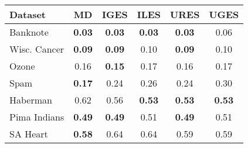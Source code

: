 \begin{tabular}{lccccc}
\toprule
Dataset & MD & IGES & ILES & URES & UGES \\
\midrule
Banknote & \textbf{0.03} & \textbf{0.03} & \textbf{0.03} & \textbf{0.03} & 0.06 \\
Wisc. Cancer & \textbf{0.09} & \textbf{0.09} & 0.10 & \textbf{0.09} & 0.10 \\
Ozone & 0.16 & \textbf{0.15} & 0.17 & 0.16 & 0.17 \\
Spam & \textbf{0.17} & 0.24 & 0.26 & 0.24 & 0.30 \\
Haberman & 0.62 & 0.56 & \textbf{0.53} & \textbf{0.53} & \textbf{0.53} \\
Pima Indians & \textbf{0.49} & \textbf{0.49} & 0.51 & \textbf{0.49} & 0.51 \\
SA Heart & \textbf{0.58} & 0.64 & 0.64 & 0.59 & 0.59 \\
\bottomrule
\end{tabular}